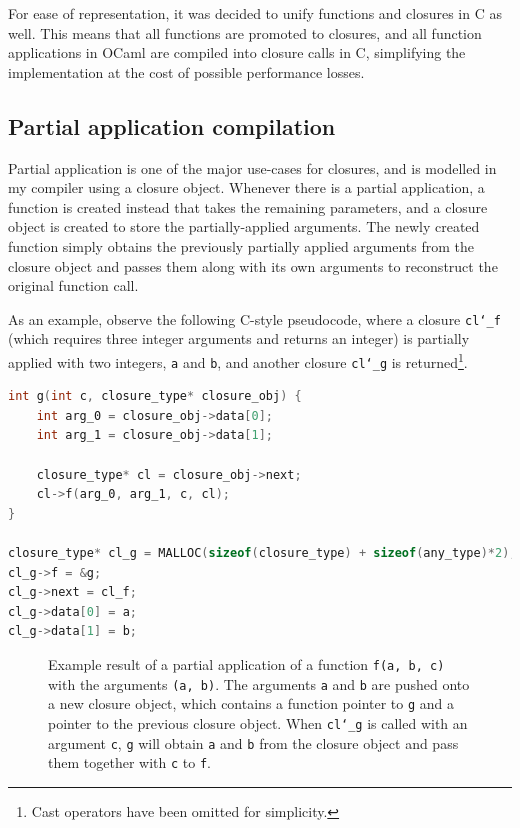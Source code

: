 For ease of representation, it was decided to unify functions and closures in C
as well. This means that all functions are promoted to closures, and all
function applications in OCaml are compiled into closure calls in C, simplifying
the implementation at the cost of possible performance losses.

\subsection{Partial application compilation}\label{partial-app}

Partial application is one of the major use-cases for closures, and is modelled
in my compiler using a closure object. Whenever there is a partial application,
a function is created instead that takes the remaining parameters, and a closure
object is created to store the partially-applied arguments. The newly created
function simply obtains the previously partially applied arguments from the
closure object and passes them along with its own arguments to reconstruct the
original function call.

As an example, observe the following C-style pseudocode, where a closure
\texttt{cl\char`_f} (which requires three integer arguments and returns an
integer) is partially applied with two integers, \texttt{a} and \texttt{b}, and
another closure \texttt{cl\char`_g} is returned\footnote{Cast operators have
been omitted for simplicity.}.

\begin{lstlisting}[language=C]
int g(int c, closure_type* closure_obj) {
    int arg_0 = closure_obj->data[0];
    int arg_1 = closure_obj->data[1];
    
    closure_type* cl = closure_obj->next;
    cl->f(arg_0, arg_1, c, cl);
}

closure_type* cl_g = MALLOC(sizeof(closure_type) + sizeof(any_type)*2);
cl_g->f = &g;
cl_g->next = cl_f;
cl_g->data[0] = a;
cl_g->data[1] = b;
\end{lstlisting}

\begin{figure}
    \centering
    
    \caption{Example result of a partial application of a function \texttt{f(a, 
    b, c)} with the arguments \texttt{(a, b)}. The arguments \texttt{a} and 
    \texttt{b} are pushed onto a new closure object, which contains a function 
    pointer to \texttt{g} and a pointer to the previous closure object. When 
    \texttt{cl\char`_g} is called with an argument \texttt{c}, \texttt{g} will 
    obtain \texttt{a} and \texttt{b} from the closure object and pass them 
    together with \texttt{c} to \texttt{f}.}\label{fig:partial-app}
\end{figure}

